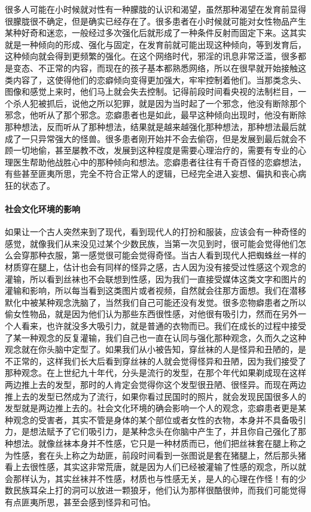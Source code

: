 很多人可能在小时候就对性有一种朦胧的认识和渴望，虽然那种渴望在发育前显得很朦胧很不确定，但是确实已经存在了。很多患者在小时候就可能对女性物品产生某种好奇和迷恋，一般经过多次强化后就形成了一种条件反射而固定下来。这其实就是一种倾向的形成、强化与固定，在发育前就可能出现这种倾向，等到发育后，这种倾向就会得到更频繁的强化。在这个网络时代，邪淫的讯息非常泛滥，很多都是变态、不正常的内容，而现在的孩子基本都熟悉网络，所以在很早就开始接触这类内容了，这使得他们的恋癖倾向变得更加强大，牢牢控制着他们。当那类念头、图像和感觉上来时，他们马上就会失去控制。记得前段时间看央视的法制栏目，一个杀人犯被抓后，说他之所以犯罪，就是因为当时起了一个邪念，他没有断除那个邪念，他听从了那个邪念。恋癖患者也是如此，最早这种倾向出现时，他没有断除那种想法，反而听从了那种想法，结果就是越来越强化那种想法，那种想法最后就成了一只异常强大的怪兽。很多患者刚开始并不会去偷窃，但是发展到最后就会不顾一切地偷，甚至屡教不改，发展到这种程度是需要心理治疗的，需要有专业的心理医生帮助他战胜心中的那种倾向和想法。恋癖患者往往有千奇百怪的恋癖想法，有些甚至匪夷所思，完全不符合正常人的逻辑，已经完全进入妄想、偏执和丧心病狂的状态了。

\paragraph{社会文化环境的影响}

如果让一个古人突然来到了现代，看到现代人的打扮和服装，应该会有一种奇怪的感觉，就像我们从来没见过某个少数民族，当第一次见到时，很可能会觉得他们怎么会穿那种衣服，第一感觉很可能会觉得奇怪。当古人看到现代人把蜘蛛丝一样的材质穿在腿上，估计也会有同样的怪异之感，古人因为没有接受过性感这个观念的灌输，所以看到丝袜也不会联想到性感，因为我们一直接受媒体这类文字和图片的灌输和影响，所以每当看到这类图片或者视频，自然就会往那方面想。我们在潜移默化中被某种观念洗脑了，当然我们自己可能还没有发觉。很多恋物癖患者之所以偷女性物品，就是因为他们认为那些东西很性感，对他很有吸引力，然而在另外一个人看来，也许就没多大吸引力，就是普通的衣物而已。我们在成长的过程中接受了某一种观念的反复灌输，我们自己也一直在认同与强化那种观念，久而久之这种观念就在你头脑中定型了。如果我们从小被告知，穿丝袜的人是怪异和丑陋的，是不正常的，这样我们长大后看到穿丝袜的人就会觉得怪异和丑陋，因为我们接受了那种观念。在上世纪九十年代，分头是流行的发型，在那个年代如果剃成现在这样两边推上去的发型，那时的人肯定会觉得你这个发型很丑陋、很怪异。而现在两边推上去的发型已然成为了流行，如果你看过民国时的照片，就会发现民国很多人的发型就是两边推上去的。社会文化环境的确会影响一个人的观念，恋癖患者更是某种观念的受害者，其实不管是身体的某个部位或者女性的衣物，本身并不具备吸引力，是想法赋予了它们吸引力，是某种念头在你脑中产生了，并且你自己强化了那种想法。就像丝袜本身并不性感，它只是一种材质而已，他们把丝袜套在腿上称之为性感，套在头上称之为劫匪，前段时间看到一张图说是套在猪腿上，然后那头猪看上去很性感，其实这非常荒唐，就是因为人们已经被灌输了性感的观念，所以就会那样认为，其实丝袜并不性感，材质也与性感无关，是人的心理在作怪！有的少数民族耳朵上打的洞可以放进一颗狼牙，他们认为那样很酷很帅，而我们可能觉得有点匪夷所思，甚至会感到怪异和可怕。

